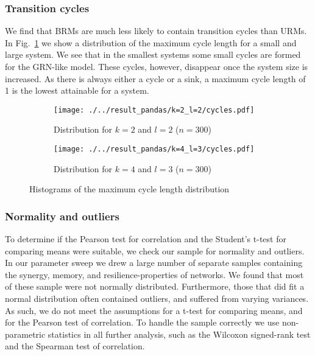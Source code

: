 \documentclass[../main.tex]{subfiles}
\begin{document}
\subsubsection{Transition cycles}

We find that BRMs are much less likely to contain transition cycles than URMs.
In Fig.~\ref{fig:cycles} we show a distribution of the maximum cycle length for a small and large system.
We see that in the smallest systems some small cycles are formed for the GRN-like model.
These cycles, however, disappear once the system size is increased.
As there is always either a cycle or a sink, a maximum cycle length of 1 is the lowest attainable for a system.

\begin{figure}[H]
    \centering
    \begin{subfigure}[b]{0.48\textwidth}
        \texttt{[image: ./../result\_pandas/k=2\_l=2/cycles.pdf]}
        \caption{Distribution for $k=2$ and $l=2$ ($n=300$)}
    \end{subfigure}
    \begin{subfigure}[b]{0.48\textwidth}
        \texttt{[image: ./../result\_pandas/k=4\_l=3/cycles.pdf]}
        \caption{Distribution for $k=4$ and $l=3$ ($n=300$)}
    \end{subfigure}
    \caption{Histograms of the maximum cycle length distribution}
    \label{fig:cycles}
\end{figure}


\subsubsection{Normality and outliers}

To determine if the Pearson test for correlation and the Student's t-test for comparing means were suitable, we check our sample for normality and outliers.
In our parameter sweep we drew a large number of separate samples containing the synergy, memory, and resilience-properties of networks.
We found that most of these sample were not normally distributed.
Furthermore, those that did fit a normal distribution often contained outliers, and suffered from varying variances.
As such, we do not meet the assumptions for a t-test for comparing means, and for the Pearson test of correlation.
To handle the sample correctly we use non-parametric statistics in all further analysis, such as the Wilcoxon signed-rank test and the Spearman test of correlation. %
\end{document}
